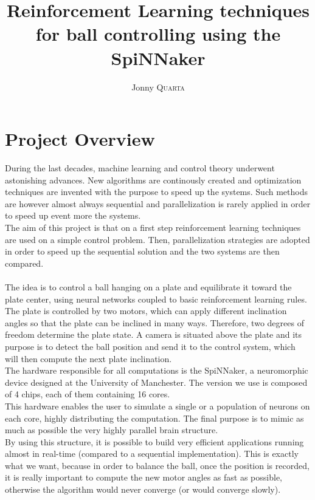 \documentclass{article}
\title{\textbf{Reinforcement Learning techniques \\ for ball controlling using the SpiNNaker}} %
\author{Jonny \textsc{Quarta}} %
\begin{document}
\maketitle %

\tableofcontents

\section{Project Overview}
During the last decades, machine learning and control theory underwent astonishing advances. New algorithms are continously created and optimization techniques are invented with the purpose to speed up the systems. Such methods are however almost always sequential and parallelization is rarely applied in order to speed up event more the systems. \\

The aim of this project is that on a first step reinforcement learning techniques are used on a simple control problem. Then, parallelization strategies are adopted in order to speed up the sequential solution and the two systems are then compared. \\ \\

The idea is to control a ball hanging on a plate and equilibrate it toward the plate center, using neural networks coupled to basic reinforcement learning rules. The plate is controlled by two motors, which can apply different inclination angles so that the plate can be inclined in many ways. Therefore, two degrees of freedom determine the plate state. A camera is situated above the plate and its purpose is to detect the ball position and send it to the control system, which will then compute the next plate inclination.\\

The hardware responsible for all computations is the SpiNNaker, a neuromorphic device designed at the University of Manchester. The version we use is composed of 4 chips, each of them containing 16 cores.\\
This hardware enables the user to simulate a single or a population of neurons on each core, highly distributing the computation. The final purpose is to mimic as much as possible the very highly parallel brain structure. \\

By using this structure, it is possible to build very efficient applications running almost in real-time (compared to a sequential implementation). This is exactly what we want, because in order to balance the ball, once the position is recorded, it is really important to compute the new motor angles as fast as possible, otherwise the algorithm would never converge (or would converge slowly). \\ \\
\end{document}
